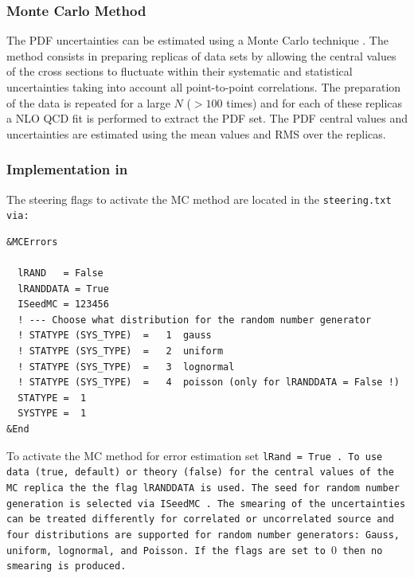 


\subsubsection{Monte Carlo Method}
\label{sec:ToyMC}

The PDF uncertainties can be estimated using a Monte Carlo technique \cite{Giele:1998gw, mcmethod2}.
The method consists in preparing replicas of data sets by allowing the central values of the cross sections to 
fluctuate within their systematic and statistical uncertainties taking into account all point-to-point correlations.
The preparation of the data is repeated for a large $N$ ($>100$ times) and for each of these replicas a NLO QCD fit is performed to 
extract the PDF set. The PDF central values and uncertainties are estimated using the mean values and RMS 
over the replicas. 
\subsubsection{Implementation in \fitter\ }
The steering flags to activate the MC method are located in the \tt steering.txt \rm via:

\begin{verbatim}
&MCErrors

  lRAND   = False  
  lRANDDATA = True
  ISeedMC = 123456 
  ! --- Choose what distribution for the random number generator 
  ! STATYPE (SYS_TYPE)  =   1  gauss
  ! STATYPE (SYS_TYPE)  =   2  uniform
  ! STATYPE (SYS_TYPE)  =   3  lognormal
  ! STATYPE (SYS_TYPE)  =   4  poisson (only for lRANDDATA = False !)
  STATYPE =  1
  SYSTYPE =  1
&End
\end{verbatim}
To activate the MC method for error estimation set \tt lRand = True \rm.
To use data (true, default) or theory (false) for the central values of the MC replica
the the flag \tt lRANDDATA \rm is used. The seed for random number generation is selected 
via \tt ISeedMC \rm . The smearing of the uncertainties can be treated differently for correlated 
or uncorrelated source and four distributions are supported for random number generators: Gauss, uniform, lognormal, and Poisson. If the flags are set to $0$ then no smearing is produced.




